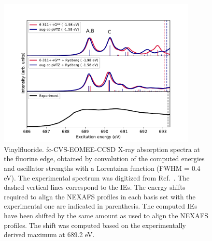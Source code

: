 \documentclass[journal=jctcce,manuscript=article]{achemso}
\begin{document}
\begin{figure}[H]
\includegraphics[width=0.9\textwidth]{Spectra/CH2CHF_F.pdf}  
\caption{Vinylfluoride. fc-CVS-EOMEE-CCSD X-ray absorption spectra at the fluorine edge, obtained by convolution of the computed energies and oscillator strengths with a Lorentzian function (FWHM = 0.4 eV). The experimental spectrum was digitized from Ref.~. 
The dashed vertical lines correspond to the IEs.  
The energy shifts 
required to align the NEXAFS profiles in each basis set with the
experimental one are indicated in parenthesis. The computed IEs have been shifted by the same amount as used to align the NEXAFS profiles. 
The shift was computed based on the experimentally 
derived maximum at 689.2 eV.
\label{fgr:vinylfluoride:F}}
\end{figure}
%
%
\end{document}
